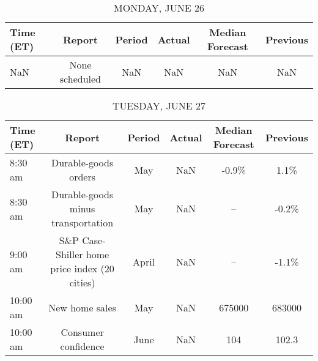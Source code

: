 \documentclass{article}%
\begin{document}
%
\normalsize%


\begin{table}[htbp]%
\caption{MONDAY, JUNE 26}%
\centering%
\begin{adjustbox}{width=1\textwidth}%
\begin{tabular}{lccccc}
\toprule
Time (ET) &         Report & Period & Actual & Median Forecast & Previous \\
\midrule
      NaN & None scheduled &    NaN &    NaN &             NaN &      NaN \\
\bottomrule
\end{tabular}
%
\end{adjustbox}%
\end{table}

%


\begin{table}[htbp]%
\caption{TUESDAY, JUNE 27}%
\centering%
\begin{adjustbox}{width=1\textwidth}%
\begin{tabular}{lccccc}
\toprule
Time (ET) &                                        Report & Period & Actual & Median Forecast & Previous \\
\midrule
  8:30 am &                          Durable-goods orders &    May &    NaN &           -0.9\% &     1.1\% \\
  8:30 am &            Durable-goods minus transportation &    May &    NaN &              -- &    -0.2\% \\
  9:00 am & S\&P Case-Shiller home price index (20 cities) &  April &    NaN &              -- &    -1.1\% \\
 10:00 am &                                New home sales &    May &    NaN &          675000 &   683000 \\
 10:00 am &                           Consumer confidence &   June &    NaN &             104 &    102.3 \\
\bottomrule
\end{tabular}
%
\end{adjustbox}%
\end{table}

%
\end{document}
